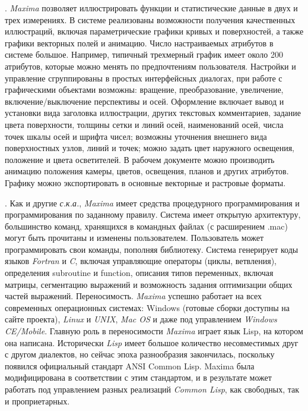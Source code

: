 . \textit{Maxima} позволяет иллюстрировать функции и статистические данные в двух и трех измерениях. В системе реализованы возможности получения качественных иллюстраций, включая параметрические графики кривых и поверхностей, а также графики векторных полей и анимацию. Число настраиваемых атрибутов в системе большое. Например, типичный трехмерный график имеет около 200 атрибутов, которые можно менять по предпочтениям пользователя. Настройки и управление сгруппированы в простых интерфейсных диалогах, при работе с графическими объектами возможны: вращение, преобразование, увеличение, включение/выключение перспективы и осей. Оформление включает вывод и установки вида заголовка иллюстрации, других текстовых комментариев, задание цвета поверхности, толщины сетки и линий осей, наименований осей, числа точек шкалы осей и шрифта чисел; возможны уточнения внешнего вида поверхностных узлов, линий и точек; можно задать цвет наружного освещения, положение и цвета осветителей. В рабочем документе можно производить анимацию положения камеры, цветов, освещения, планов и других атрибутов. Графику можно экспортировать в основные векторные и растровые форматы.

. Как и другие \textit{с.к.а.}, \textit{Maxima} имеет средства процедурного программирования и программирования по заданному правилу. Система имеет открытую архитектуру, большинство команд, хранящихся в командных файлах (с расширением .mac) могут быть прочитаны и изменены пользователем. Пользователь может программировать свои команды, пополняя библиотеку. Система генерирует коды языков \textit{Fortran} и \textit{C}, включая управляющие операторы (циклы, ветвления), определения subroutine и function, описания типов переменных, включая матрицы, сегментацию выражений и возможность задания оптимизации общих частей выражений.
Переносимость. \textit{Maxima} успешно работает на всех современных операционных системах: Windows (готовые сборки доступны на сайте проекта), \textit{Linux} и \textit{UNIX}, \textit{Mac OS} и даже под управлением \textit{Windows CE/Mobile}. Главную роль в переносимости \textit{Maxima} играет язык Lisp, на котором она написана. Исторически \textit{Lisp} имеет большое количество несовместимых друг с другом диалектов, но сейчас эпоха разнообразия закончилась, поскольку появился официальный стандарт ANSI Common Lisp. Maxima была модифицирована в соответствии с этим стандартом, и в результате может работать под управлением разных реализаций \textit{Common Lisp}, как свободных, так и проприетарных.


